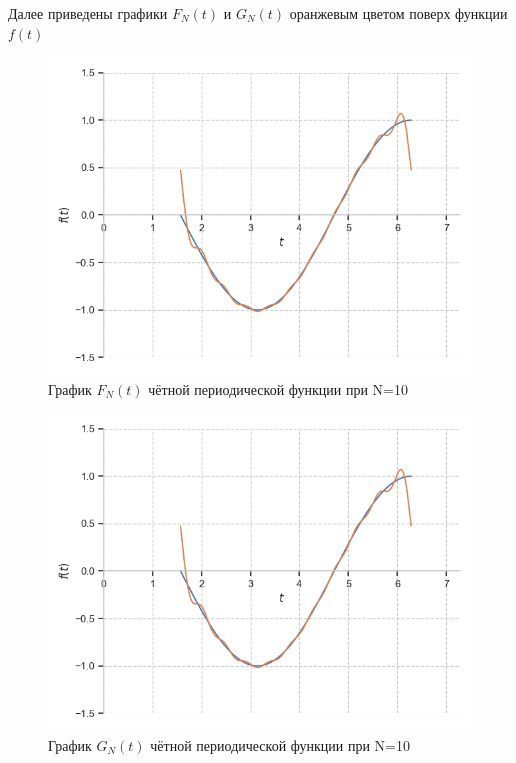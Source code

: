 \documentclass[a4paper, 16pt]{article}
\begin{document}
\noindent Далее приведены графики $F_N(t)$ и $G_N(t)$ оранжевым цветом поверх функции $f(t)$
\newpage
\vspace*{10mm}
\begin{figure}[!htb]
    \centering
    \includegraphics[scale=0.8]{fur_cos_n=10.png}
    \captionsetup{skip=0pt}
    \caption{График $F_N(t)$ чётной периодической функции при N=10}
    \label{Рис:13}
\end{figure}
\begin{figure}[!htb]
    \centering
    \includegraphics[scale=0.8]{cfur_cos_n=10.png}
    \captionsetup{skip=0pt}
    \caption{График $G_N(t)$ чётной периодической функции при N=10}
    \label{Рис:14}
\end{figure}
\end{document}
